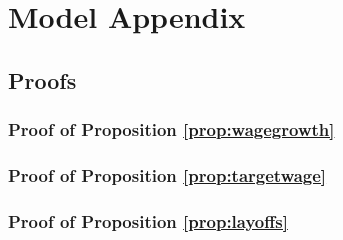\appendix
\section{Model Appendix} 
\subsection{Proofs}
\subsubsection*{Proof of Proposition \ref{prop:wagegrowth}} \label{proof:wagegrowth}
\subsubsection*{Proof of Proposition \ref{prop:targetwage}} \label{proof:targetwage}
\subsubsection*{Proof of Proposition \ref{prop:layoffs}} \label{proof:layoffs}
